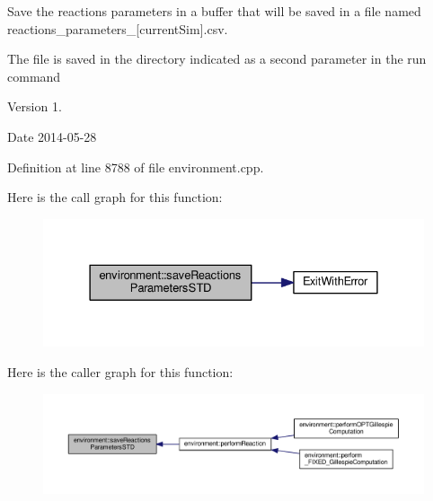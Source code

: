 Save the reactions parameters in a buffer that will be saved in a file named reactions\-\_\-parameters\-\_\-\mbox{[}current\-Sim\mbox{]}.csv. 

The file is saved in the directory indicated as a second parameter in the run command \begin{DoxyVersion}{Version}
1. 
\end{DoxyVersion}
\begin{DoxyDate}{Date}
2014-\/05-\/28 
\end{DoxyDate}


Definition at line 8788 of file environment.\-cpp.



Here is the call graph for this function\-:\nopagebreak
\begin{figure}[H]
\begin{center}
\leavevmode
\includegraphics[width=328pt]{a00003_ae342684050eb7b52144015d258133098_cgraph}
\end{center}
\end{figure}




Here is the caller graph for this function\-:\nopagebreak
\begin{figure}[H]
\begin{center}
\leavevmode
\includegraphics[width=350pt]{a00003_ae342684050eb7b52144015d258133098_icgraph}
\end{center}
\end{figure}


